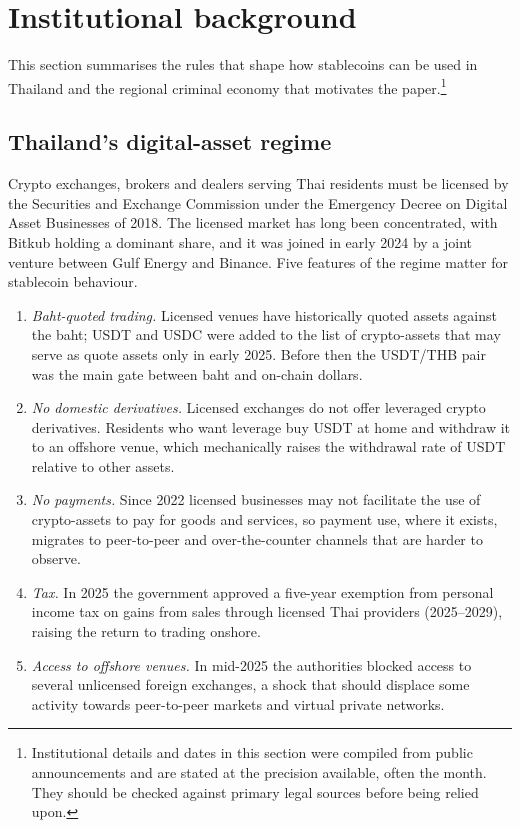 \section{Institutional background}\label{sec:background}

This section summarises the rules that shape how stablecoins can be used in Thailand and the regional criminal economy
that motivates the paper.\footnote{Institutional details and dates in this section were compiled from public announcements and are stated at the precision available, often the month. They should be checked against primary legal sources before being relied upon.}

\subsection{Thailand's digital-asset regime}

Crypto exchanges, brokers and dealers serving Thai residents must be licensed by the Securities and Exchange
Commission under the Emergency Decree on Digital Asset Businesses of 2018. The licensed market has long been
concentrated, with Bitkub holding a dominant share, and it was joined in early 2024 by a joint venture between Gulf
Energy and Binance. Five features of the regime matter for stablecoin behaviour.

\begin{enumerate}[leftmargin=1.4em,label=(\roman*)]
\item \emph{Baht-quoted trading.} Licensed venues have historically quoted assets against the baht; USDT and USDC were
added to the list of crypto-assets that may serve as quote assets only in early 2025. Before then the USDT/THB pair was
the main gate between baht and on-chain dollars.
\item \emph{No domestic derivatives.} Licensed exchanges do not offer leveraged crypto derivatives. Residents who want
leverage buy USDT at home and withdraw it to an offshore venue, which mechanically raises the withdrawal rate of USDT
relative to other assets.
\item \emph{No payments.} Since 2022 licensed businesses may not facilitate the use of crypto-assets to pay for goods and
services, so payment use, where it exists, migrates to peer-to-peer and over-the-counter channels that are harder to
observe.
\item \emph{Tax.} In 2025 the government approved a five-year exemption from personal income tax on gains from sales
through licensed Thai providers (2025--2029), raising the return to trading onshore.
\item \emph{Access to offshore venues.} In mid-2025 the authorities blocked access to several unlicensed foreign
exchanges, a shock that should displace some activity towards peer-to-peer markets and virtual private networks.
\end{enumerate}

